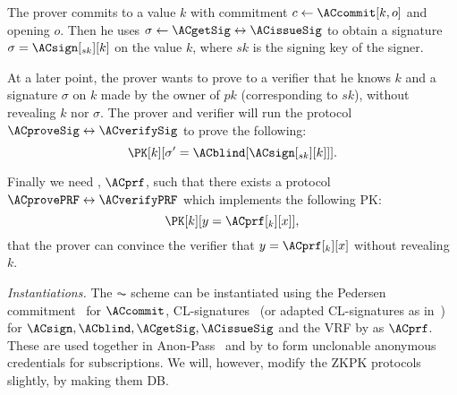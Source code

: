 The prover commits to a value \(k\) with commitment \(c\gets \ACcommit[k, o]\) 
and opening \(o\).
Then he uses \(\sigma\gets \ACgetSig\leftrightarrow \ACissueSig\) to obtain a 
signature \(\sigma = \ACsign[_{sk}][k]\) on the value \(k\), where \(sk\) is the 
signing key of the signer.

At a later point, the prover wants to prove to a verifier that he knows \(k\) 
and a signature \(\sigma\) on \(k\) made by the owner of \(pk\) (corresponding 
to \(sk\)), \ie without revealing \(k\) nor \(\sigma\).
The prover and verifier will run the protocol \(\ACproveSig\leftrightarrow 
  \ACverifySig\) to prove the following:
\begin{equation*}
  \PK[k][\sigma' = \ACblind[\ACsign[_{sk}][k]]].
\end{equation*}


Finally we need , \(\ACprf\), such that there exists a protocol 
\(\ACprovePRF\leftrightarrow \ACverifyPRF\) which implements the following 
\ac{PK}:
\begin{equation*}
  \PK[k][y = \ACprf[_k][x]],
\end{equation*}
\ie that the prover can convince the verifier that \(y = \ACprf[_k][x]\) without 
revealing \(k\).


\emph{Instantiations.}
The \(\AC\) scheme can be instantiated using the Pedersen 
commitment~\cite{PedersenCommitment} for \(\ACcommit\),
CL-signatures~\cite{CLsignatures} (or adapted CL-signatures as 
in~\cite{AnonPass}) for \(\ACsign, \ACblind, \ACgetSig, \ACissueSig\) and
the \ac{VRF} by \citet{DY-VRF} as \(\ACprf\).
These are used together in \eg Anon-Pass~\cite{AnonPass} and by 
\citet{HowToWinTheCloneWars} to form unclonable anonymous credentials for 
subscriptions.
We will, however, modify the \ac{ZKPK} protocols slightly, by making them 
\acl{DB}.
